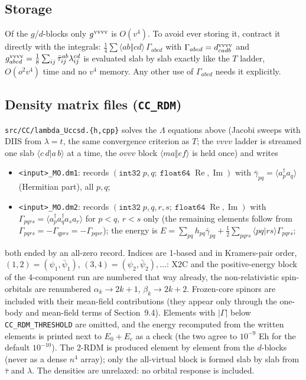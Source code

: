 \documentclass[11pt]{article}
\newcommand{\anti}[4]{\langle #1#2\Vert #3#4\rangle}
\begin{document}
\subsection{Storage}

Of the $g$/$d$-blocks only $g^{\rm vvvv}$ is $O(v^4)$. To avoid ever storing it, contract it directly with the
integrals: $\tfrac14\sum\anti{a}{b}{c}{d}\,\Gamma_{abcd}$ with $\Gamma_{abcd}=d^{\rm vvvv}_{cadb}$ and
$g^{\rm vvvv}_{abcd}=\tfrac18\sum_{ij}\bar\tau_{ij}^{ab}\lambda_{ij}^{cd}$ is evaluated slab by slab exactly like the
$T$ ladder, $O(o^2v^4)$ time and no $v^4$ memory. Any other use of $\Gamma_{abcd}$ needs it explicitly.

\subsection{Density matrix files (\texttt{CC\_RDM})}

\texttt{src/CC/lambda\_Uccsd.\{h,cpp\}} solves the $\Lambda$ equations above (Jacobi sweeps with DIIS from $\lambda=t$,
the same convergence criterion as $T$; the $vvvv$ ladder is streamed one slab $\langle c\,d|a\,b\rangle$ at a time, the
$ovvv$ block $\anti{m}{a}{e}{f}$ is held once) and writes
\begin{itemize}
\item \texttt{<input>\_MO.dm1}: records $(\texttt{int32}\;p,q;\ \texttt{float64}\;\operatorname{Re},\operatorname{Im})$ with
 $\bar\gamma_{pq}=\langle a_p^\dagger a_q\rangle$ (Hermitian part), all $p,q$;
\item \texttt{<input>\_MO.dm2}: records $(\texttt{int32}\;p,q,r,s;\ \texttt{float64}\;\operatorname{Re},\operatorname{Im})$ with
 $\Gamma_{pqrs}=\langle a_p^\dagger a_q^\dagger a_s a_r\rangle$ for $p<q$, $r<s$ only (the remaining elements follow from
 $\Gamma_{pqrs}=-\Gamma_{qprs}=-\Gamma_{pqsr}$); the energy is
 $E=\sum_{pq}h_{pq}\bar\gamma_{pq}+\tfrac12\sum_{pqrs}\langle pq|rs\rangle\Gamma_{pqrs}$;
\end{itemize}
both ended by an all-zero record. Indices are 1-based and in Kramers-pair order, $(1,2)=(\psi_1,\bar\psi_1)$,
$(3,4)=(\psi_2,\bar\psi_2),\dots$: X2C and the positive-energy block of the 4-component run are numbered that way
already, the non-relativistic spin-orbitals are renumbered $\alpha_k\to2k+1$, $\beta_k\to2k+2$. Frozen-core spinors are
included with their mean-field contributions (they appear only through the one-body and mean-field terms of
Section~9.4). Elements with $|\Gamma|$ below \texttt{CC\_RDM\_THRESHOLD} are omitted, and the energy recomputed from the
written elements is printed next to $E_0+E_c$ as a check (the two agree to $10^{-9}$ Eh for the default $10^{-10}$).
The 2-RDM is produced element by element from the $d$-blocks (never as a dense $n^4$ array); only the all-virtual
block is formed slab by slab from $\bar\tau$ and $\lambda$. The densities are unrelaxed: no orbital response is included.
\end{document}
